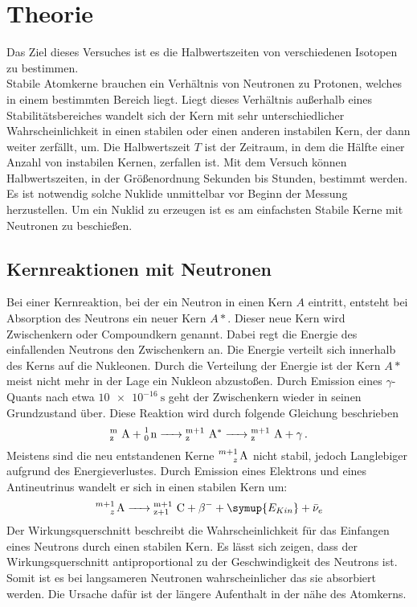 \section{Theorie}
\label{sec:Theorie}
Das Ziel dieses Versuches ist es die Halbwertszeiten von verschiedenen Isotopen zu bestimmen.
\\
Stabile Atomkerne brauchen ein Verhältnis von Neutronen zu Protonen, welches in einem bestimmten Bereich liegt. Liegt dieses Verhältnis außerhalb eines Stabilitätsbereiches
wandelt sich der Kern mit sehr unterschiedlicher Wahrscheinlichkeit in einen stabilen oder einen anderen instabilen Kern, der dann weiter zerfällt, um.
Die Halbwertszeit $T$ ist der Zeitraum, in dem die Hälfte einer Anzahl von instabilen Kernen, zerfallen ist. Mit dem Versuch können Halbwertszeiten, in der Größenordnung
Sekunden bis Stunden, bestimmt werden. Es ist notwendig solche Nuklide unmittelbar vor Beginn der Messung herzustellen. Um ein Nuklid zu erzeugen 
ist es am einfachsten Stabile Kerne mit Neutronen zu beschießen.
\subsection{Kernreaktionen mit Neutronen}
Bei einer Kernreaktion, bei der ein Neutron in einen Kern $A$ eintritt, entsteht bei Absorption des Neutrons ein neuer Kern $A*$.
Dieser neue Kern wird Zwischenkern oder Compoundkern genannt. Dabei regt die Energie des einfallenden Neutrons den Zwischenkern an. Die Energie verteilt sich innerhalb des Kerns auf die Nukleonen.
Durch die Verteilung der Energie ist der Kern $A*$ meist nicht mehr in der Lage ein Nukleon abzustoßen. Durch Emission eines $\gamma$-Quants nach etwa $\SI{10e-16}{\second}$
geht der Zwischenkern wieder in seinen Grundzustand über. 
Diese Reaktion wird durch folgende Gleichung beschrieben
\begin{equation*}
    \ce{{^m_z A} + \ce{^1_0 n} -> {^{m+1}_z A^*} -> {^{m+1}_z A} } + \gamma \, .
\end{equation*}
Meistens sind die neu entstandenen Kerne $\ce{^{m+1}_z A}$ nicht stabil, jedoch Langlebiger aufgrund des Energieverlustes.
Durch Emission eines Elektrons und eines Antineutrinus wandelt er sich in einen stabilen Kern um:
\begin{equation*}
    \ce{^{m+1}_z A -> {^{m+1}_{z+1} C} + $\beta$- }+\symup{E_{Kin}} + \bar{\nu}_e
\end{equation*}
Der Wirkungsquerschnitt beschreibt die Wahrscheinlichkeit für das Einfangen eines Neutrons durch einen stabilen Kern. 
Es lässt sich zeigen, dass der Wirkungsquerschnitt antiproportional zu der Geschwindigkeit des Neutrons ist. Somit ist es bei langsameren Neutronen wahrscheinlicher das sie absorbiert werden.
Die Ursache dafür ist der längere Aufenthalt in der nähe des Atomkerns.
